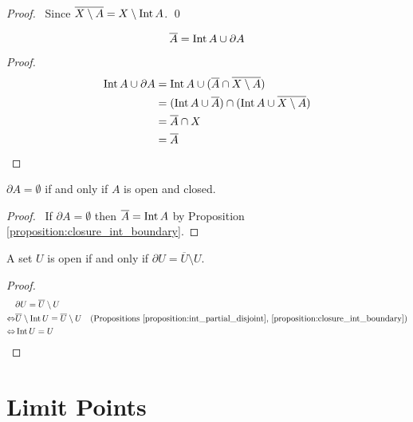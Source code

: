 \begin{proof}
    \pf\ Since $\overline{X \setminus A} = X \setminus \operatorname{Int} A$. \qed
\end{proof}

\begin{proposition}
    \label{proposition:closure_int_boundary}
    \[ \overline{A} = \operatorname{Int} A \cup \partial A \]
\end{proposition}

\begin{proof}
    \pf
    \begin{align*}
        \operatorname{Int} A \cup \partial A & = \operatorname{Int} A \cup (\overline{A} \cap \overline{X \setminus A}) \\
        & = (\operatorname{Int} A \cup \overline{A}) \cap (\operatorname{Int} A \cup \overline{X \setminus A}) \\
        & = \overline{A} \cap X \\
        & = \overline{A}
    \end{align*}
\end{proof}

\begin{proposition}
    $\partial A = \emptyset$ if and only if $A$ is open and closed.
\end{proposition}

\begin{proof}
    \pf\ If $\partial A = \emptyset$ then $\overline{A} = \operatorname{Int} A$ by Proposition \ref{proposition:closure_int_boundary}.
\end{proof}

\begin{proposition}
    A set $U$ is open if and only if $\partial U = \overline{U} \setminus U$.
\end{proposition}

\begin{proof}
    \pf
    \begin{align*}
        & \partial U = \overline{U} \setminus U \\
        \Leftrightarrow & \overline{U} \setminus \operatorname{Int} U = \overline{U} \setminus U & (\text{Propositions \ref{proposition:int_partial_disjoint}, \ref{proposition:closure_int_boundary}})\\
        \Leftrightarrow & \operatorname{Int} U = U & \relax
    \end{align*}
\end{proof}

\section{Limit Points}

